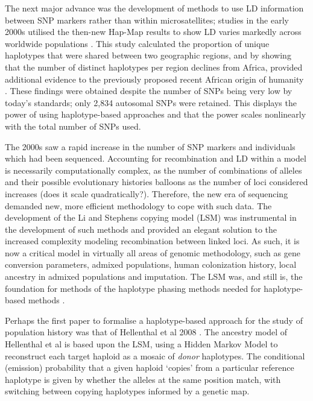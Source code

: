 The next major advance was the development of methods to use LD information between SNP markers rather than within microsatellites; studies in the early 2000s utilised the then-new Hap-Map results \cite{gibbs2003international} to show LD varies markedly across worldwide populations \cite{conrad2006worldwide}. This study calculated the proportion of unique haplotypes that were shared between two geographic regions, and by showing that the number of distinct haplotypes per region declines from Africa, provided additional evidence to the previously proposed recent African origin of humanity \cite{cann1987mitochondrial}. These findings were obtained despite the number of SNPs being very low by today's standards; only 2,834 autosomal SNPs were retained. This displays the power of using haplotype-based approaches and that the power scales nonlinearly with the total number of SNPs used.  

 
The 2000s saw a rapid increase in the number of SNP markers and individuals which had been sequenced. Accounting for recombination and LD within a model is necessarily computationally complex, as the number of combinations of alleles and their possible evolutionary histories balloons as the number of loci considered increases (does it scale quadratically?). Therefore, the new era of sequencing demanded new, more efficient methodology to cope with such data. The development of the Li and Stephens copying model (LSM) \cite{Li2003} was instrumental in the development of such methods \cite{song2016li} and provided an elegant solution to the increased complexity modeling recombination between linked loci. As such, it is now a critical model in virtually all areas of genomic methodology, such as gene conversion parameters, admixed populations, human colonization history, local ancestry in admixed populations and imputation. The LSM was, and still is, the foundation for methods of the haplotype phasing methods needed for haplotype-based methods \cite{stephens2003comparison, stephens2005accounting}. 

Perhaps the first paper to formalise a haplotype-based approach for the study of population history was that of Hellenthal et al 2008 \cite{hellenthal2008inferring}. The ancestry model of Hellenthal et al is based upon the LSM, using a Hidden Markov Model to reconstruct each target haploid as a mosaic of \textit{donor} haplotypes. The conditional (emission) probability that a given haploid `copies' from a particular reference haplotype is given by whether the alleles at the same position match, with switching between copying haplotypes informed by a genetic map. 

